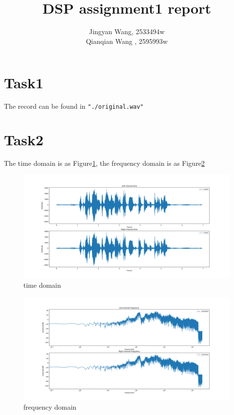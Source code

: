 \documentclass[a4paper,12pt]{article}
\begin{document}
%
   \title{\textbf{DSP assignment1 report}}

   \author{Jingyan Wang, 2533494w \\ Qianqian Wang , 2595993w}
          
   \date{}

   \maketitle
   
   \tableofcontents
 
  \newpage

\section{Task1}
The record can be found in \lstinline|"./original.wav"|
\section{Task2}
The time domain is as Figure\ref{fig_recordT}, the frequency domain is as Figure\ref{fig_recordF}
\begin{figure}[h]   
	\centering 
	\includegraphics[width=12cm]{../Output/Figures/recordT} 
	\caption{time domain}   
	\label{fig_recordT}
\end{figure}
\begin{figure}[h]   
	\centering 
	\includegraphics[width=12cm]{../Output/Figures/recordF} 
	\caption{frequency domain}   
	\label{fig_recordF}
\end{figure}
\end{document}
